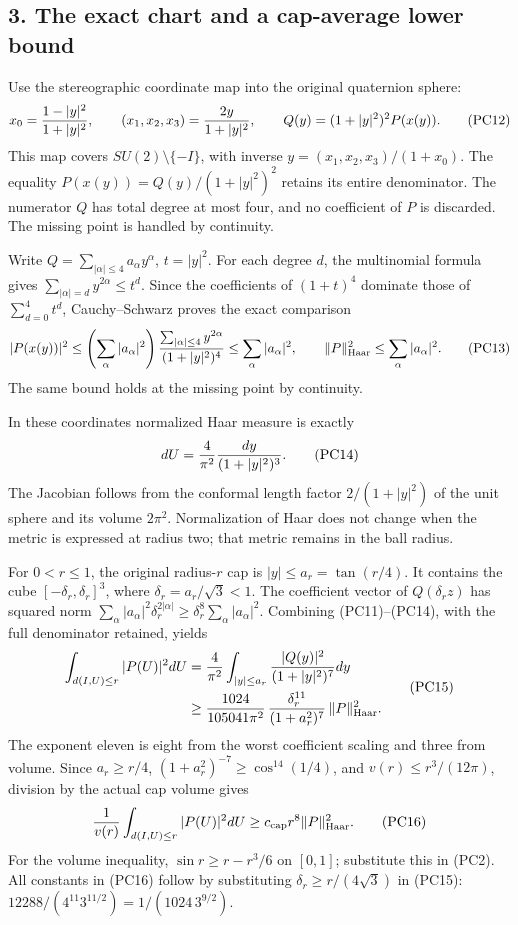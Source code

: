 \documentclass[11pt]{article}
\begin{document}
\subsection*{3. The exact chart and a cap-average lower bound}

Use the stereographic coordinate map into the original quaternion sphere:
\[
 x_0={1-|y|^2\over1+|y|^2},\qquad
 (x_1,x_2,x_3)={2y\over1+|y|^2},
 \qquad
 Q(y)=(1+|y|^2)^2P(x(y)).
 \tag{PC12}
\]
This map covers \(SU(2)\setminus\{-I\}\), with inverse
\(y=(x_1,x_2,x_3)/(1+x_0)\). The equality
\(P(x(y))=Q(y)/(1+|y|^2)^2\) retains its entire denominator.
The numerator \(Q\) has total degree at most four, and no coefficient
of \(P\) is discarded. The missing point is handled by continuity.

Write \(Q=\sum_{|\alpha|\le4}a_\alpha y^\alpha\), \(t=|y|^2\).
For each degree \(d\), the multinomial formula gives
\(\sum_{|\alpha|=d}y^{2\alpha}\le t^d\). Since the coefficients of
\((1+t)^4\) dominate those of \(\sum_{d=0}^4t^d\), Cauchy–Schwarz
proves the exact comparison
\[
 |P(x(y))|^2
 \le\left(\sum_\alpha|a_\alpha|^2\right)
       {\sum_{|\alpha|\le4}y^{2\alpha}\over(1+|y|^2)^4}
 \le\sum_\alpha|a_\alpha|^2,\qquad
 \|P\|_{\rm Haar}^2\le\sum_\alpha|a_\alpha|^2.
 \tag{PC13}
\]
The same bound holds at the missing point by continuity.

In these coordinates normalized Haar measure is exactly
\[
 dU={4\over\pi^2}{dy\over(1+|y|^2)^3}.
 \tag{PC14}
\]
The Jacobian follows from the conformal length factor
\(2/(1+|y|^2)\) of the unit sphere and its volume \(2\pi^2\).
Normalization of Haar does not change when the metric is expressed
at radius two; that metric remains in the ball radius.

For \(0<r\le1\), the original radius-\(r\) cap is
\(|y|\le a_r=\tan(r/4)\). It contains the cube
\([-\delta_r,\delta_r]^3\), where \(\delta_r=a_r/\sqrt3<1\).
The coefficient vector of \(Q(\delta_r z)\) has squared norm
\(\sum_\alpha|a_\alpha|^2\delta_r^{2|\alpha|}
\ge\delta_r^8\sum_\alpha|a_\alpha|^2\).
Combining (PC11)–(PC14), with the full denominator retained, yields
\[
 \begin{aligned}
 \int_{d(I,U)\le r}|P(U)|^2dU
 &={4\over\pi^2}\int_{|y|\le a_r}
          {|Q(y)|^2\over(1+|y|^2)^7}dy\\
 &\ge {1024\over105041\pi^2}\,
       {\delta_r^{11}\over(1+a_r^2)^7}\,
                       \|P\|_{\rm Haar}^2.
 \end{aligned}\tag{PC15}
\]
The exponent eleven is eight from the worst coefficient scaling and
three from volume. Since
\(a_r\ge r/4\),
\((1+a_r^2)^{-7}\ge\cos^{14}(1/4)\), and
\(v(r)\le r^3/(12\pi)\), division by the actual cap volume gives
\[
 {1\over v(r)}\int_{d(I,U)\le r}|P(U)|^2dU
 \ge c_{\rm cap}r^8\|P\|_{\rm Haar}^2.
 \tag{PC16}
\]
For the volume inequality, \(\sin r\ge r-r^3/6\) on \([0,1]\);
substitute this in (PC2). All constants in (PC16) follow by
substituting \(\delta_r\ge r/(4\sqrt3)\) in (PC15):
\(12288/(4^{11}3^{11/2})=1/(1024\,3^{9/2})\).
\end{document}

